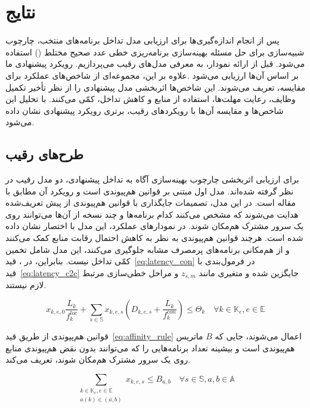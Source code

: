 \section{نتایج}

پس از انجام اندازه‌گیری‌ها برای ارزیابی مدل تداخل برنامه‌های منتخب، چارچوب شبیه‌سازی برای حل مسئله بهینه‌سازی برنامه‌ریزی خطی عدد صحیح مختلط () استفاده می‌شود. قبل از ارائه نمودار، به معرفی مدل‌های رقیب می‌پردازیم. رویکرد پیشنهادی ما بر اساس آن‌ها ارزیابی می‌شود .علاوه بر این، مجموعه‌ای از شاخص‌های عملکرد برای مقایسه، تعریف می‌شوند. این شاخص‌ها اثربخشی مدل پیشنهادی را از نظر تأخیر تکمیل وظایف، رعایت مهلت‌ها، استفاده از منابع و کاهش تداخل، کمّی می‌کنند. با تحلیل این شاخص‌ها و مقایسه آن‌ها با رویکردهای رقیب، برتری رویکرد پیشنهادی نشان داده می‌شود.

\subsection{طرح‌های رقیب}

برای ارزیابی اثربخشی چارچوب بهینه‌سازی آگاه به تداخل پیشنهادی، دو مدل رقیب در نظر گرفته شده‌اند. مدل اول مبتنی بر قوانین هم‌پیوندی است و رویکرد آن مطابق با مقاله \cite{Kaur2020KEIDS} است. در این مدل، تصمیمات جایگذاری با قوانین هم‌پیوندی از پیش تعریف‌شده هدایت می‌شوند که مشخص می‌کنند کدام برنامه‌ها و چند نسخه از آن‌ها می‌توانند روی یک سرور مشترک هم‌مکان شوند. در نمودارهای عملکرد، این مدل با اختصار  نشان داده شده است. هرچند قوانین هم‌پیوندی به نظر به کاهش احتمال رقابت منابع کمک می‌کنند و از هم‌مکانی برنامه‌های پرمصرف مشابه جلوگیری می‌کنند، این مدل شامل تخمین کمّی تداخل نیست. بنابراین، در ، قید~\eqref{eq:latency_con} در فرمول‌بندی با قید~\eqref{eq:latency_c2c} جایگزین شده و متغیری مانند $z_{s,m}$ و مراحل خطی‌سازی مرتبط لازم نیستند. 

\begin{equation} \label{eq:latency_c2c}
    x_{k,e,0}\frac{L_k}{f^{loc}_k} + \sum_{s \in \mathbb{S}} x_{k,e,s} \left(D_{k,e,s} + \frac{L_k}{f^{con}_k} \right) \leq \Theta_k \quad \forall k \in \mathbb{K}_e, e \in \mathbb{E}
\end{equation}

قوانین هم‌پیوندی از طریق قید~\eqref{eq:affinity_rule} اعمال می‌شوند، جایی که $B$ ماتریس هم‌پیوندی است و بیشینه تعداد برنامه‌هایی را که می‌توانند بدون نقض هم‌پیوندی منابع روی یک سرور مشترک هم‌مکان شوند، تعریف می‌کند.

\begin{equation} \label{eq:affinity_rule}
    \sum_{\substack{k \in \mathbb{K}_e, e \in \mathbb{E} \\ a(k) \in (a,b)}} x_{k,e,s} \leq B_{a,b} \quad \forall s \in \mathbb{S}, a,b \in \mathbb{A}
\end{equation}

